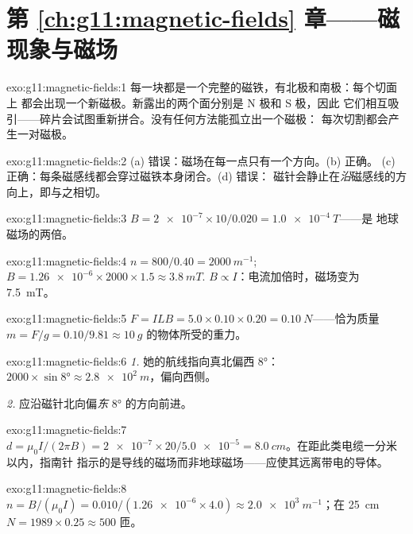 \section*{第 \ref{ch:g11:magnetic-fields} 章——磁现象与磁场}

\begin{solution}{exo:g11:magnetic-fields:1}
每一块都是一个完整的磁铁，有北极和南极：每个切面上
都会出现一个新磁极。新露出的两个面分别是 N 极和 S 极，因此
它们相互吸引——碎片会试图重新拼合。没有任何方法能孤立出一个磁极：
每次切割都会产生一对磁极。
\end{solution}

\begin{solution}{exo:g11:magnetic-fields:2}
(a) 错误：磁场在每一点只有一个方向。(b) 正确。
(c) 正确：每条磁感线都会穿过磁铁本身闭合。(d) 错误：
磁针会静止在\emph{沿}磁感线的方向上，即与之相切。
\end{solution}

\begin{solution}{exo:g11:magnetic-fields:3}
$B = \num{2e-7} \times 10 / 0.020 = \qty{1.0e-4}{T}$——是
地球磁场的两倍。
\end{solution}

\begin{solution}{exo:g11:magnetic-fields:4}
$n = 800/0.40 = \qty{2000}{m^{-1}}$;
$B = \num{1.26e-6} \times 2000 \times 1.5 \approx \qty{3.8}{mT}$.
$B \propto I$：电流加倍时，磁场变为 \qty{7.5}{mT}。
\end{solution}

\begin{solution}{exo:g11:magnetic-fields:5}
$F = ILB = 5.0 \times 0.10 \times 0.20 = \qty{0.10}{N}$——恰为质量
$m = F/g = 0.10/9.81 \approx \qty{10}{g}$ 的物体所受的重力。
\end{solution}

\begin{solution}{exo:g11:magnetic-fields:6}
\emph{1.} 她的航线指向真北偏西 $\ang{8}$：
$2000 \times \sin\ang{8} \approx \qty{2.8e2}{m}$，偏向西侧。

\emph{2.} 应沿磁针北向偏\emph{东} $\ang{8}$ 的方向前进。
\end{solution}

\begin{solution}{exo:g11:magnetic-fields:7}
$d = \mu_0 I / (2\pi B) = \num{2e-7} \times 20 / \num{5.0e-5}
= \qty{8.0}{cm}$。在距此类电缆一分米以内，指南针
指示的是导线的磁场而非地球磁场——应使其远离带电的导体。
\end{solution}

\begin{solution}{exo:g11:magnetic-fields:8}
$n = B/(\mu_0 I) = 0.010 / (\num{1.26e-6} \times 4.0)
\approx \qty{2.0e3}{m^{-1}}$；在 \qty{25}{cm}
$N = 1989 \times 0.25 \approx 500$ 匝。
\end{solution}

